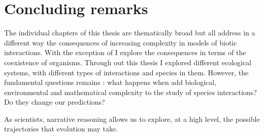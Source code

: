 \documentclass[12pt]{article}
\begin{document}


\section*{Concluding remarks}
The individual chapters of this thesis are thematically broad but all address in a different way the consequences of increasing complexity in models of biotic interactions. With the exception of  I explore the consequences in terms of the coexistence of organisms. Through out this thesis I explored different ecological systems, with different types of interactions and species in them. However, the fundamental questions remains : what happens when add biological, environmental and mathematical complexity to the study of species interactions? Do they change our predictions?

 As scientists, narrative reasoning allows us to explore, at a high level, the possible trajectories that evolution may take.



\clearpage


\end{document}
